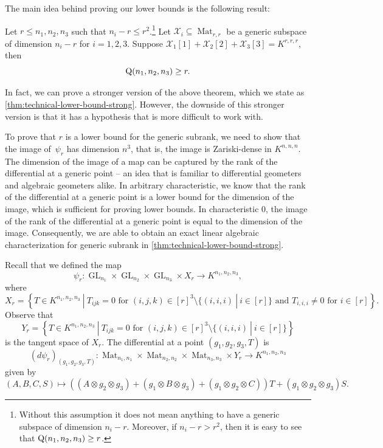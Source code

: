 \documentclass[10pt,a4paper]{article}
\theoremstyle{definition}
\theoremstyle{remark}
\newcommand{\gensubrank}{{\rm Q}}
\newcommand{\GL}{\operatorname{GL}}
\newcommand{\Mat}{\operatorname{Mat}}
\begin{document}
The main idea behind proving our lower bounds is the following result:

\begin{theorem} \label{thm:technical-lower-bound}
Let $r \leq n_1,n_2,n_3$ such that $n_i - r \leq r^2$.\footnote{Without this assumption it does not mean anything to have a generic subspace of dimension $n_i - r$. Moreover, if $n_i - r  > r^2$, then it is easy to see that $\gensubrank(n_1,n_2,n_3) \geq r$.} Let $\mathcal{X}_i \subseteq \Mat_{r,r}$ be a generic subspace of dimension $n_i - r$ for $i = 1,2,3$. Suppose $\mathcal{X}_1[1] + \mathcal{X}_2[2] + \mathcal{X}_3[3] = K^{r,r,r}$, then
$$
\gensubrank(n_1,n_2,n_3) \geq r.
$$
\end{theorem}

%

In fact, we can prove a stronger version of the above theorem, which we state as \autoref{thm:technical-lower-bound-strong}. However, the downside of this stronger version is that it has a hypothesis that is more difficult to work with. 

To prove that $r$ is a lower bound for the generic subrank, we need to show that the image of~$\psi_r$ has dimension $n^3$, that is, the image is Zariski-dense in $K^{n,n,n}$. The dimension of the image of a map can be captured by the rank of the differential at a generic point -- an idea that is familiar to differential geometers and algebraic geometers alike. In arbitrary characteristic, we know that the rank of the differential at a generic point is a lower bound for the dimension of the image, which is sufficient for proving lower bounds. In characteristic $0$, the image of the rank of the differential at a generic point is equal to the dimension of the image. Consequently, we are able to obtain an exact linear algebraic characterization for generic subrank in \autoref{thm:technical-lower-bound-strong}.

Recall that we defined the map 
$$
\psi_r : \GL_{n_1} \times \GL_{n_2} \times \GL_{n_3} \times X_r \rightarrow K^{n_1,n_2,n_3},
$$
where 
$$
X_r = \left\{T \in K^{n_1,n_2,n_3} \ | \ T_{ijk} = 0 \text{ for } (i,j,k) \in [r]^3 \setminus \{(i,i,i)\ |\ i \in [r]\} \text{ and } T_{i,i,i} \neq 0 \text{ for } i \in [r] \right\}.
$$
Observe that 
\[
Y_r = \left\{T \in K^{n_1,n_2,n_3} \ | \ T_{ijk} = 0 \text{ for } (i,j,k) \in [r]^3 \setminus \{(i,i,i)\ |\ i \in [r] \} \right\}
\]is the tangent space of $X_r$. The differential at a point $(g_1,g_2,g_3,T)$ is
$$
 (d\psi_r)_{(g_1,g_2,g_3,T)} : \Mat_{n_1,n_1} \times \Mat_{n_2,n_2} \times \Mat_{n_3,n_3} \times Y_r  \longrightarrow  K^{n_1,n_2,n_3} 
$$
given by 
$$
(A,B,C,S)  \longmapsto  ((A \otimes g_2 \otimes g_3) + (g_1 \otimes B \otimes g_3) + (g_1 \otimes g_2 \otimes C))T + (g_1 \otimes g_2 \otimes g_3)S.
$$
\end{document}
